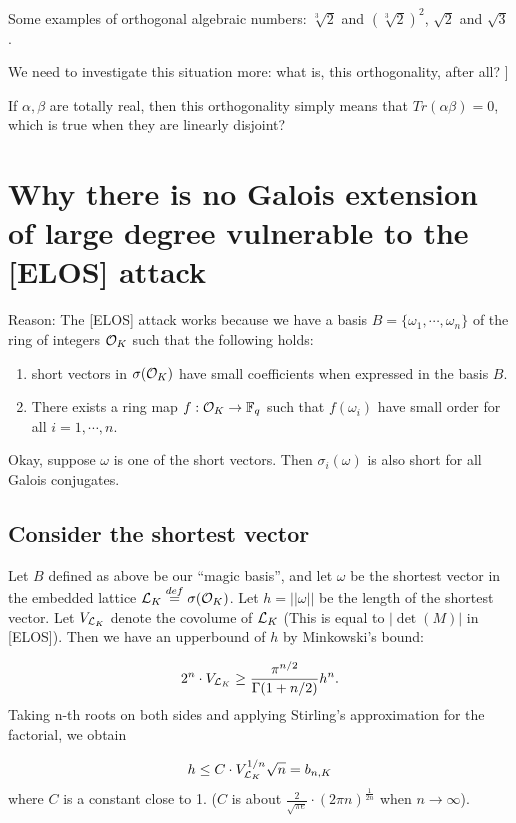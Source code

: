 \documentclass{amsart}
\begin{document}
Some examples of orthogonal algebraic numbers: $\sqrt[3]{2}$ and
$(\sqrt[3]{2})^2$, $\sqrt{2}$ and $\sqrt{3}$.

We need to investigate this situation more: what is, this orthogonality, after all? ]

If $\alpha, \beta$ are totally real, then this orthogonality simply means that $Tr(\alpha \beta) = 0$, which is true when they are linearly disjoint?


\section{Why there is no Galois extension of large degree vulnerable to the [ELOS] attack}

Reason: The [ELOS] attack works because we have a basis $B = \{\omega_1, \cdots, \omega_n\}$ of the ring of integers $\mathcal{O}_K$ such that the following holds:
\begin{enumerate}
\item short vectors in $\sigma(\mathcal{O}_K)$ have small coefficients when expressed in the basis $B$.

\item There exists a ring map $f: \mathcal{O}_K \to \mathbb{F}_q$ such that $f(\omega_i)$ have small order for all $i = 1, \cdots, n$.
\end{enumerate}

Okay, suppose $\omega$ is one of the short vectors. Then
$\sigma_i(\omega)$ is also short for all Galois conjugates.



\subsection{Consider the shortest vector}

Let $B$ defined as above be our ``magic basis'', and let $\omega$ be the shortest vector in the embedded lattice $\mathcal{L}_K \stackrel{def} = \sigma(\mathcal{O}_K)$. Let $h = ||\omega||$
be the length of the shortest vector. Let $V_{\mathcal{L}_K}$ denote the covolume of $\mathcal{L}_K$ (This is equal to $|\det(M)|$ in [ELOS]). Then we have an upperbound of $h$ by Minkowski's bound:

\[
    2^n \cdot V_{\mathcal{L}_K} \geq \frac{\pi^{n/2}}{\Gamma(1+n/2)} h^n.
\]
Taking n-th roots on both sides and applying Stirling's approximation for the factorial, we obtain

\[
     h \leq C \cdot V_{\mathcal{L}_K}^{1/n} \sqrt{n} = b_{n,K}
\]
where $C$ is a constant close to 1. ($C$ is about $\frac{2}{\sqrt{\pi e}} \cdot (2 \pi n)^{\frac{1}{2n}}$ when $n \to \infty$).
\end{document}
